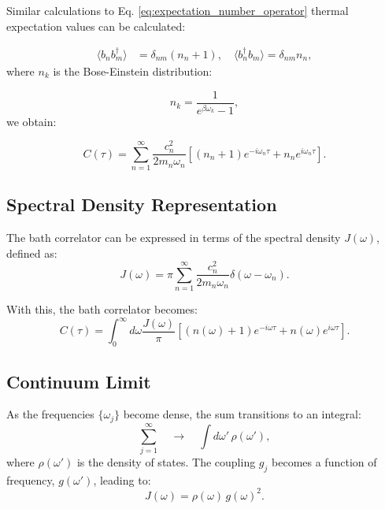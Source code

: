 Similar calculations to Eq. \eqref{eq:expectation_number_operator} thermal expectation values can be calculated:

\begin{align} \label{eq:thermal_expectations}
	\langle b_n b_m^\dagger \rangle & = \delta_{nm} (n_n + 1), \quad \langle b_n^\dagger b_m \rangle = \delta_{nm} n_n,
\end{align}
where \( n_k \) is the Bose-Einstein distribution:

\begin{equation} \label{eq:bose_einstein_distribution}
	n_k = \frac{1}{e^{\beta \omega_k} - 1},
\end{equation}
we obtain:

\begin{equation} \label{eq:correlator_result}
	C(\tau) = \sum_{n=1}^{\infty} \frac{c_n^2}{2 m_n \omega_n} \left[ (n_n + 1) e^{-i \omega_n \tau} + n_n e^{i \omega_n \tau} \right].
\end{equation}

\subsection{Spectral Density Representation}
\label{subsec:spectral_density}

The bath correlator can be expressed in terms of the spectral density \( J(\omega) \), defined as:
\begin{equation} \label{eq:spectral_density}
	J(\omega) = \pi \sum_{n=1}^{\infty} \frac{c_n^2}{2 m_n \omega_n} \delta(\omega - \omega_n).
\end{equation}

With this, the bath correlator becomes:
\begin{equation} \label{eq:correlator_spectral_density}
	C(\tau) = \int_0^\infty d\omega \frac{J(\omega)}{\pi} \left[ (n(\omega) + 1) e^{-i \omega \tau} + n(\omega) e^{i \omega \tau} \right].
\end{equation}

\subsection{Continuum Limit}
As the frequencies \( \{\omega_j\} \) become dense, the sum transitions to an integral:
\[
	\sum_{j=1}^{\infty} \quad \longrightarrow \quad \int d\omega'\,\rho(\omega'),
\]
where \( \rho(\omega') \) is the density of states. The coupling \( g_j \) becomes a function of frequency, \( g(\omega') \), leading to:
\[
	J(\omega) = \rho(\omega)\,g(\omega)^2.
\]

